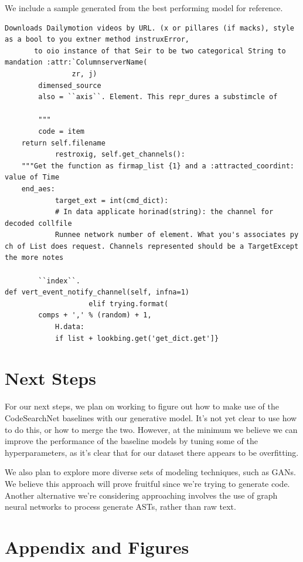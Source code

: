\documentclass{article}
\begin{document}
We include a sample generated from the best performing model for reference.
\begin{verbatim}
Downloads Dailymotion videos by URL. (x or pillares (if macks), style as a bool to you extner method instruxError,
       to oio instance of that Seir to be two categorical String to mandation :attr:`ColumnserverName(
                zr, j)
        dimensed_source
        also = ``axis``. Element. This repr_dures a substimcle of

        """
        code = item
    return self.filename
            restroxig, self.get_channels():
    """Get the function as firmap_list {1} and a :attracted_coordint: value of Time
    end_aes:
            target_ext = int(cmd_dict):
            # In data applicate horinad(string): the channel for decoded collfile
            Runnee network number of element. What you's associates py ch of List does request. Channels represented should be a TargetExcept the more notes

        ``index``.
def vert_event_notify_channel(self, infna=1)
                    elif trying.format(
        comps + ',' % (random) + 1,
            H.data:
            if list + lookbing.get('get_dict.get']}
\end{verbatim}

\section{Next Steps}
For our next steps, we plan on working to figure out how to make use of the CodeSearchNet baselines with our generative model. It's not yet clear to use how to do this, or how to merge the two. However, at the minimum we believe we can improve the performance of the baseline models by tuning some of the hyperparameters, as it's clear that for our dataset there appears to be overfitting. 

We also plan to explore more diverse sets of modeling techniques, such as GANs. We believe this approach will prove fruitful since we're trying to generate code. Another alternative we're considering approaching involves the use of graph neural networks to process generate ASTs, rather than raw text.





\newpage
\section*{Appendix and Figures}
\end{document}
